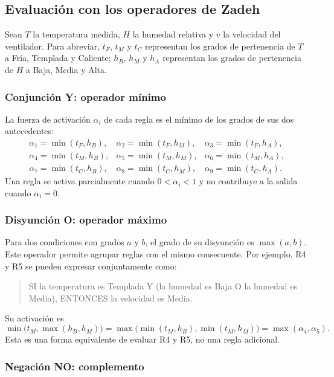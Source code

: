 \documentclass[11pt]{article}
\begin{document}
\subsection{Evaluación con los operadores de Zadeh}

Sean $T$ la temperatura medida, $H$ la humedad relativa y $v$ la velocidad
del ventilador. Para abreviar, $t_F$, $t_M$ y $t_C$ representan los grados de
pertenencia de $T$ a Fría, Templada y Caliente; $h_B$, $h_M$ y $h_A$
representan los grados de pertenencia de $H$ a Baja, Media y Alta.

\subsubsection*{Conjunción Y: operador mínimo}

La fuerza de activación $\alpha_i$ de cada regla es el mínimo de los grados
de sus dos antecedentes:
\[
\begin{array}{lll}
\alpha_1=\min(t_F,h_B), & \alpha_2=\min(t_F,h_M), & \alpha_3=\min(t_F,h_A),\\[3pt]
\alpha_4=\min(t_M,h_B), & \alpha_5=\min(t_M,h_M), & \alpha_6=\min(t_M,h_A),\\[3pt]
\alpha_7=\min(t_C,h_B), & \alpha_8=\min(t_C,h_M), & \alpha_9=\min(t_C,h_A).
\end{array}
\]
Una regla se activa parcialmente cuando $0<\alpha_i<1$ y no contribuye
a la salida cuando $\alpha_i=0$.

\subsubsection*{Disyunción O: operador máximo}

Para dos condiciones con grados $a$ y $b$, el grado de su disyunción es
$\max(a,b)$. Este operador permite agrupar reglas con el mismo consecuente.
Por ejemplo, R4 y R5 se pueden expresar conjuntamente como:
\begin{quote}
SI la temperatura es Templada Y (la humedad es Baja O la humedad es Media),
ENTONCES la velocidad es Media.
\end{quote}
Su activación es
\[
\min\bigl(t_M,\max(h_B,h_M)\bigr)
=\max\bigl(\min(t_M,h_B),\min(t_M,h_M)\bigr)
=\max(\alpha_4,\alpha_5).
\]
Esta es una forma equivalente de evaluar R4 y R5, no una regla adicional.

\subsubsection*{Negación NO: complemento}
\end{document}
